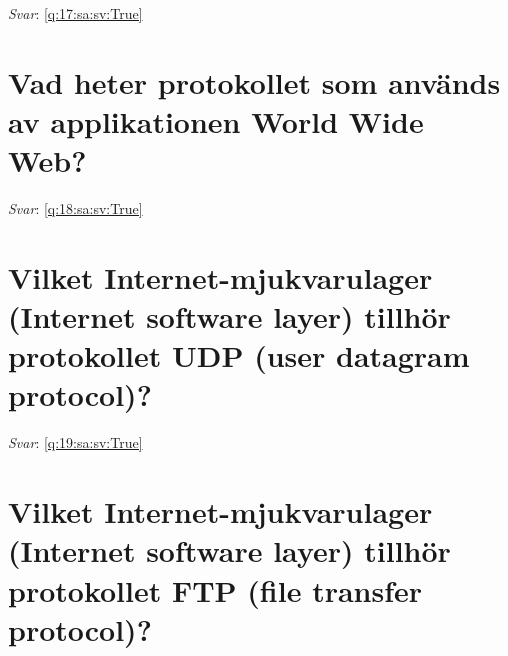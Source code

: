 \documentclass[a4paper,11pt,oneside]{book}
\begin{document}
\begin{sloppypar}
\label{q:17:sa:sv:False}

\vspace{2cm}

\noindent\makebox[\textwidth]{\hrulefill}

\vspace{1cm}

\textit{Svar}: \autoref{q:17:sa:sv:True}



\section{Vad heter protokollet som anv\"ands av applikationen World Wide Web?}

\label{q:18:sa:sv:False}

\vspace{2cm}

\noindent\makebox[\textwidth]{\hrulefill}

\vspace{1cm}

\textit{Svar}: \autoref{q:18:sa:sv:True}



\section{Vilket Internet-mjukvarulager (Internet software layer) tillh\"or protokollet UDP (user datagram protocol)?}

\label{q:19:sa:sv:False}

\vspace{2cm}

\noindent\makebox[\textwidth]{\hrulefill}

\vspace{1cm}

\textit{Svar}: \autoref{q:19:sa:sv:True}



\section{Vilket Internet-mjukvarulager (Internet software layer) tillh\"or protokollet FTP (file transfer protocol)?}

\label{q:20:sa:sv:False}

\vspace{2cm}

\noindent\makebox[\textwidth]{\hrulefill}

\vspace{1cm}


\end{sloppypar}
\end{document}

